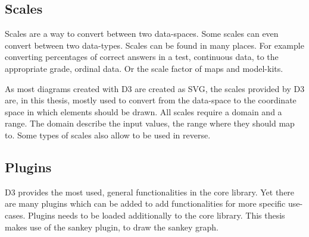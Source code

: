\subsection{Scales}

Scales are a way to convert between two data-spaces. Some scales can even convert between two data-types. Scales can be found in many places. For example converting percentages of correct answers in a test, continuous data, to the appropriate grade, ordinal data. Or the scale factor of maps and model-kits.

As most diagrams created with D3 are created as SVG, the scales provided by D3 are, in this thesis, mostly used to convert from the data-space to the coordinate space in which elements should be drawn. All scales require a domain and a range. The domain describe the input values, the range where they should map to. Some types of scales also allow to be used in reverse. 

\subsection{Plugins}

D3 provides the most used, general functionalities in the core library. Yet there are many plugins which can be added to add functionalities for more specific use-cases. Plugins needs to be loaded additionally to the core library. This thesis makes use of the sankey plugin\cite{sankey_package}, to draw the sankey graph.
